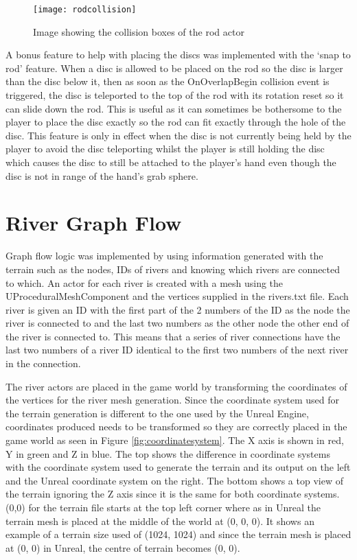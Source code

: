 \begin{figure}[h]
	\texttt{[image: rodcollision]}
	\centering
	\caption{Image showing the collision boxes of the rod actor}
	\label{fig:rodcollision}
\end{figure}

A bonus feature to help with placing the discs was implemented with the `snap to rod' feature. When a disc is allowed to be placed on the rod so the disc is larger than the disc below it, then as soon as the OnOverlapBegin collision event is triggered, the disc is teleported to the top of the rod with its rotation reset so it can slide down the rod. This is useful as it can sometimes be bothersome to the player to place the disc exactly so the rod can fit exactly through the hole of the disc. This feature is only in effect when the disc is not currently being held by the player to avoid the disc teleporting whilst the player is still holding the disc which causes the disc to still be attached to the player's hand even though the disc is not in range of the hand's grab sphere.

\section{River Graph Flow}
Graph flow logic was implemented by using information generated with the terrain such as the nodes, IDs of rivers and knowing which rivers are connected to which. An actor for each river is created with a mesh using the UProceduralMeshComponent and the vertices supplied in the rivers.txt file. Each river is given an ID with the first part of the 2 numbers of the ID as the node the river is connected to and the last two numbers as the other node the other end of the river is connected to. This means that a series of river connections have the last two numbers of a river ID identical to the first two numbers of the next river in the connection.
\newline
\par
The river actors are placed in the game world by transforming the coordinates of the vertices for the river mesh generation. Since the coordinate system used for the terrain generation is different to the one used by the Unreal Engine, coordinates produced needs to be transformed so they are correctly placed in the game world as seen in Figure \ref{fig:coordinatesystem}. The X axis is shown in red, Y in green and Z in blue. The top shows the difference in coordinate systems with the coordinate system used to generate the terrain and its output on the left and the Unreal coordinate system on the right. The bottom shows a top view of the terrain ignoring the Z axis since it is the same for both coordinate systems. (0,0) for the terrain file starts at the top left corner where as in Unreal the terrain mesh is placed at the middle of the world at (0, 0, 0). It shows an example of a terrain size used of (1024, 1024) and since the terrain mesh is placed at (0, 0) in Unreal, the centre of terrain becomes (0, 0).
\newline
\par

